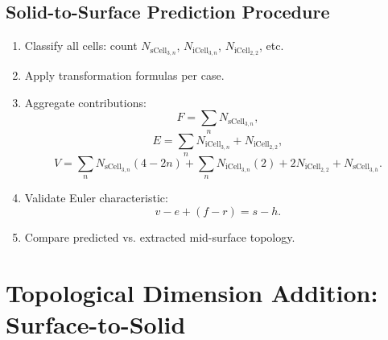 \documentclass[conference]{IEEEtran}
\begin{document}
\subsection{Solid-to-Surface Prediction Procedure}

\begin{enumerate}
    \item Classify all cells: count $N_{\mathrm{sCell}_{3,n}}$, $N_{\mathrm{iCell}_{3,n}}$, $N_{\mathrm{iCell}_{2,2}}$, etc.
    \item Apply transformation formulas per case.
    \item Aggregate contributions:
    \[
    F = \sum_n N_{\mathrm{sCell}_{3,n}},
    \]
    \[
    E = \sum_n N_{\mathrm{iCell}_{3,n}} + N_{\mathrm{iCell}_{2,2}},
    \]
    \[
    V = \sum_n N_{\mathrm{sCell}_{3,n}}(4-2n)
      + \sum_n N_{\mathrm{iCell}_{3,n}}(2)
      + 2N_{\mathrm{iCell}_{2,2}}
      + N_{\mathrm{sCell}_{3,h}}.
    \]
    \item Validate Euler characteristic:
    \[
    v - e + (f - r) = s - h.
    \]
    \item Compare predicted vs. extracted mid-surface topology.
\end{enumerate}



\section{Topological Dimension Addition: Surface-to-Solid}
\end{document}
